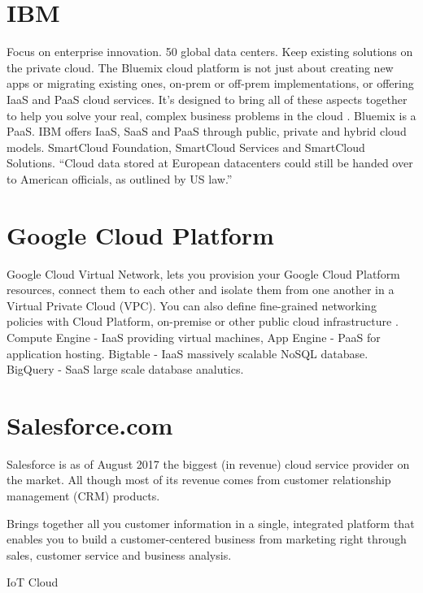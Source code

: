\section{IBM}
Focus on enterprise innovation. 50 global data centers. Keep existing solutions on the private cloud. The Bluemix cloud platform is not just about creating new apps or migrating existing ones, on-prem or off-prem implementations, or offering IaaS and PaaS cloud services. It's designed to bring all of these aspects together to help you solve your real, complex business problems in the cloud \cite{IBM}. Bluemix is a PaaS. IBM offers IaaS, SaaS and PaaS through public, private and hybrid cloud models. SmartCloud Foundation, SmartCloud Services and SmartCloud Solutions. 
\enquote{Cloud data stored at European datacenters could still be handed over to American officials, as outlined by US law.}

\section{Google Cloud Platform}

Google Cloud Virtual Network, lets you provision your Google Cloud Platform resources, connect them to each other and isolate them from one another in a Virtual Private Cloud (VPC). You can also define fine-grained networking policies with Cloud Platform, on-premise or other public cloud infrastructure \cite{predictive}. Compute Engine - IaaS providing virtual machines, App Engine - PaaS for application hosting. Bigtable - IaaS massively scalable NoSQL database. BigQuery - SaaS large scale database analutics. 

\section{Salesforce.com}
Salesforce is as of August 2017 the biggest (in revenue) cloud service provider on the market. All though most of its revenue comes from customer relationship management (CRM) products. 

Brings together all you customer information in a single, integrated platform that enables you to build a customer-centered business from marketing right through sales, customer service and business analysis. 

IoT Cloud %

